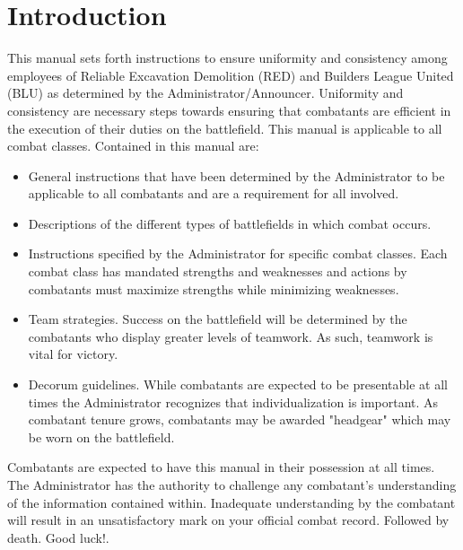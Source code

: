\section{Introduction}
\label{Introduction}
This manual sets forth instructions to ensure uniformity and consistency among employees of Reliable Excavation Demolition (RED) and Builders League United (BLU) as determined by the Administrator/Announcer.  Uniformity and consistency are necessary steps towards ensuring that combatants are efficient in the execution of their duties on the battlefield. This manual is applicable to all combat classes.  Contained in this manual are:

 \begin{itemize}

\item General instructions that have been determined by the Administrator to be applicable to all combatants and are a requirement for all involved.
\item Descriptions of the different types of battlefields in which combat occurs.  
\item Instructions specified by the Administrator for specific combat classes.  Each combat class has mandated strengths and weaknesses and actions by combatants must maximize strengths while minimizing weaknesses.  
\item Team strategies.  Success on the battlefield will be determined by the combatants who display greater levels of teamwork.  As such, teamwork is vital for victory. 
\item Decorum guidelines.  While combatants are expected to be presentable at all times the Administrator recognizes that individualization is important. As combatant tenure grows, combatants may be awarded "headgear" which may be worn on the battlefield.
\end{itemize}
Combatants are expected to have this manual in their possession at all times. The Administrator has the authority to challenge any combatant's understanding of the information contained within. Inadequate understanding by the combatant will result in an unsatisfactory mark on your official combat record. Followed by death. Good luck!.